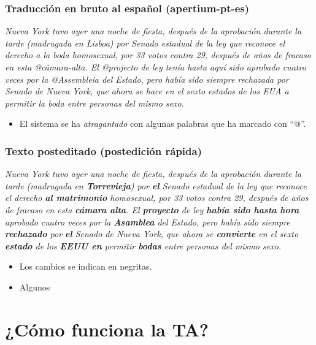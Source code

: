 \documentclass{beamer}
\newcommand{\empha}[1]{\emph{#1}\/}
\begin{document}
\begin{frame}
  \frametitle{Traducción en bruto al español (apertium-pt-es)}

  \empha{Nueva York tuvo ayer una noche de fiesta, después de la
    aprobación durante la tarde (madrugada en Lisboa) por Senado
    estadual de la ley que reconoce el derecho a la boda homosexual,
    por 33 votos contra 29, después de años de fracaso en esta
    @câmara-alta.  El @projecto de ley tenía hasta aquí sido aprobado
    cuatro veces por la @Assembleia del Estado, pero había sido
    siempre rechazada por Senado de Nueva York, que ahora se hace en
    el sexto estados de los EUA a permitir la boda entre personas del
    mismo sexo.}


  \begin{itemize}
  \item El sistema se ha \emph{atragantado} con algunas palabras que ha marcado con ``@''.
  \end{itemize}
\end{frame}

\begin{frame}
  \frametitle{Texto posteditado (postedición rápida)}

  \empha{Nueva York tuvo ayer una noche de fiesta, después de la
    aprobación durante la tarde (madrugada en \textbf{Torrevieja}) por
    \textbf{el} Senado estadual de la ley que reconoce el derecho
    \textbf{al matrimonio} homosexual, por 33 votos contra 29, después
    de años de fracaso en esta \textbf{cámara alta}.  El
    \textbf{proyecto} de ley \textbf{había sido hasta hora} aprobado
    cuatro veces por la \textbf{Asamblea} del Estado, pero había sido
    siempre \textbf{rechazado} por \textbf{el} Senado de Nueva York, que ahora
    se \textbf{convierte} en el sexto \textbf{estado} de los
    \textbf{EEUU en} permitir \textbf{bodas} entre personas del mismo
    sexo.}

  \begin{itemize}
  \item Los cambios se indican en negritas.
  \item Algunos 
  \end{itemize}
\end{frame}



\section{¿Cómo funciona la TA?}
\end{document}
